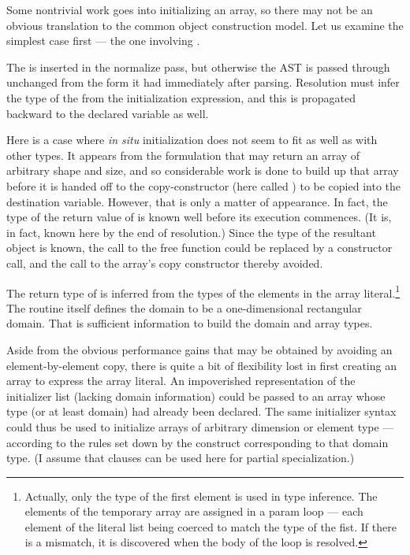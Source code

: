 Some nontrivial work goes into initializing an array, so there may not be an obvious
translation to the common object construction model.  Let us examine the simplest case
first --- the one involving .

The  is inserted in the normalize pass, but otherwise the AST is passed
through unchanged from the form it had immediately after parsing.  Resolution must infer the type of the
 from the initialization expression, and this is propagated backward to the
declared variable as well.

Here is a case where \emph{in situ} initialization does not seem to fit as well as with other
types.  It appears from the formulation that  may return an
array of arbitrary shape and size, and so considerable work is done to build up that array
before it is handed off to the copy-constructor (here called ) to be
copied into the destination variable.  However, that is only a matter of appearance.  In
fact, the type of the return value of  is known well before
its execution commences.  (It is, in fact, known here by the end of resolution.)  Since
the type of the resultant object is known, the call to the free function
 could be replaced by a constructor call, and the call to the
array's copy constructor thereby avoided.

The return type of  is inferred from the types of the
elements in the array literal.\footnote{Actually, only the type of the first element is
  used in type inference.  The elements of the temporary array are assigned in a param
  loop --- each element of the literal list being coerced to match the type of the fist.
  If there is a mismatch, it is discovered when the body of the loop is resolved.}  The
routine itself defines the domain to be a one-dimensional rectangular domain.  That is
sufficient information to build the domain and array types.

Aside from the obvious performance gains that may be obtained by avoiding an
element-by-element copy, there is quite a bit of flexibility lost in first creating an
array to express the array literal.  An impoverished representation of the initializer
list (lacking domain information) could be passed to an array whose type (or at least
domain) had already been declared.  The same initializer syntax could thus be used to
initialize arrays of arbitrary dimension or element type --- according to the rules set
down by the construct corresponding to that domain type.  (I assume that 
clauses can be used here for partial specialization.)  

